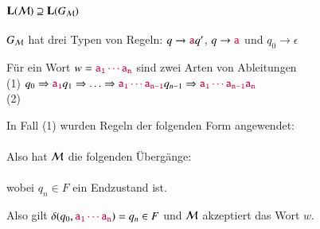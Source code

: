 \documentclass[aspectratio=1610,onlymath]{beamer}
\begin{document}
\begin{frame}[t]\frametitle{$\textbf{\textcolor{black}{L}}(\mathcal{M})\supseteq\textbf{\textcolor{black}{L}}(G_{\mathcal{M}})$}

$G_{\mathcal{M}}$ hat drei Typen von Regeln: $q\to \mathtt{\textcolor{purple}{a}}q'$, $q\to \mathtt{\textcolor{purple}{a}}$ und $q_0\to \epsilon$
\\[1ex]\pause

Für ein Wort $w=\mathtt{\textcolor{purple}{a_1\cdots a_n}}$ sind \alert{zwei} Arten von Ableitungen 
\\[1ex]

(1) $q_0\Rightarrow \mathtt{\textcolor{purple}{a_1}}q_1 \Rightarrow \ldots \Rightarrow\mathtt{\textcolor{purple}{a_1\cdots a_{n-1}}}q_{n-1}\Rightarrow \mathtt{\textcolor{purple}{a_1\cdots a_{n-1}a_n}}$\\[1ex]
(2) 
\bigskip\pause


In Fall (1) wurden Regeln der folgenden Form angewendet:\\[1ex]
\\[1ex]
Also hat $\mathcal{M}$ die folgenden Übergänge: \\[1ex]
\\[1ex]
wobei $q_n\in F$ ein Endzustand ist.
\bigskip\pause

Also gilt $\delta(q_0,\mathtt{\textcolor{purple}{a_1\cdots a_n}})=q_n\in F$ und $\mathcal{M}$ akzeptiert das Wort $w$.

\end{frame}
\end{document}
